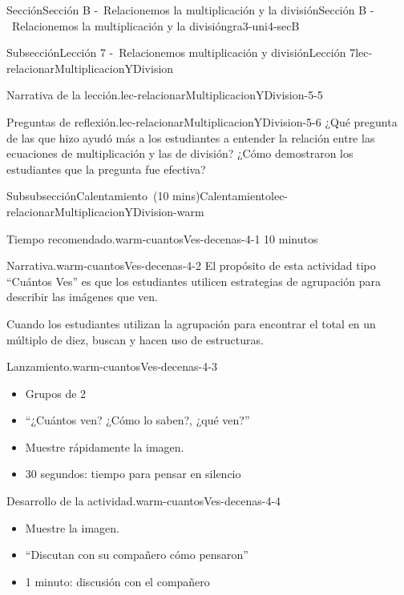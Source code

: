 \documentclass[oneside,10pt,]{article}
\begin{document}
\begin{sectionptx}{Sección}{Sección B -~Relacionemos la multiplicación y la división}{}{Sección B -~Relacionemos la multiplicación y la división}{}{}{gra3-uni4-secB}
\begin{subsectionptx}{Subsección}{Lección 7 -~Relacionemos multiplicación y división}{}{Lección 7}{}{}{lec-relacionarMultiplicacionYDivision}
\begin{introduction}{}
\begin{paragraphs}{Narrativa de la lección.}{lec-relacionarMultiplicacionYDivision-5-5}
\end{paragraphs}%
\begin{paragraphs}{Preguntas de reflexión.}{lec-relacionarMultiplicacionYDivision-5-6}%
¿Qué pregunta de las que hizo ayudó más a los estudiantes a entender la relación entre las ecuaciones de multiplicación y las de división? ¿Cómo demostraron los estudiantes que la pregunta fue efectiva?%
\end{paragraphs}%
\end{introduction}%
%
%
\typeout{************************************************}
\typeout{************************************************}
%
\begin{subsubsectionptx}{Subsubsección}{Calentamiento~(10 mins)}{}{Calentamiento}{}{}{lec-relacionarMultiplicacionYDivision-warm}
\par
\begin{paragraphs}{Tiempo recomendado.}{warm-cuantosVes-decenas-4-1}%
10 minutos%
\end{paragraphs}%
\begin{paragraphs}{Narrativa.}{warm-cuantosVes-decenas-4-2}%
El propósito de esta actividad tipo ``Cuántos Ves'' es que los estudiantes utilicen estrategias de agrupación para describir las imágenes que ven.%
\par
Cuando los estudiantes utilizan la agrupación para encontrar el total en un múltiplo de diez, buscan y hacen uso de estructuras.%
\end{paragraphs}%
\begin{paragraphs}{Lanzamiento.}{warm-cuantosVes-decenas-4-3}%
%
\begin{itemize}[label=\textbullet]
\item{}Grupos de 2%
\item{}``¿Cuántos ven? ¿Cómo lo saben?, ¿qué ven?''%
\item{}Muestre rápidamente la imagen.%
\item{}30 segundos: tiempo para pensar en silencio%
\end{itemize}
\end{paragraphs}%
\begin{paragraphs}{Desarrollo de la actividad.}{warm-cuantosVes-decenas-4-4}%
%
\begin{itemize}[label=\textbullet]
\item{}Muestre la imagen.%
\item{}``Discutan con su compañero cómo pensaron''%
\item{}1 minuto: discusión con el compañero%

\end{itemize}
\end{paragraphs}
\end{subsubsectionptx}
\end{subsectionptx}
\end{sectionptx}
\end{document}
